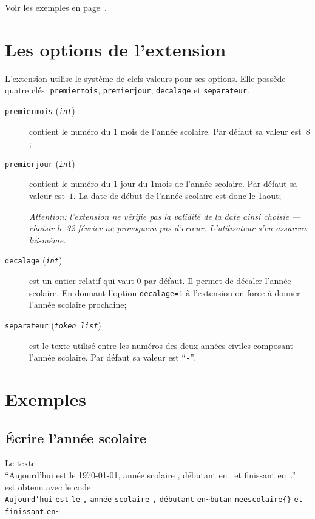 \documentclass[full]{l3doc}
\newcommand\BOP{\discretionary{}{}{}}
\begin{document}
Voir les exemples en page~\pageref{sec:aspect}.


\section{Les options de l'extension}
\label{sec:clefs}

L'extension utilise le système de clefs-valeurs pour ses options. Elle possède
quatre clés: \texttt{premiermois}, \texttt{premierjour}, \texttt{decalage} et
\texttt{separateur}.

\begin{description}
\item[\texttt{premiermois} (\textit{\texttt{int}})] contient le numéro du 1\ier
  mois de l'année scolaire. Par défaut sa valeur est~\(8\);

\item[\texttt{premierjour} (\textit{\texttt{int}})] contient le numéro du 1\ier
  jour du 1\ier mois de l'année scolaire. Par défaut sa valeur est~\(1\). La
  date de début de l'année scolaire est donc le 1\ier aout;

  \emph{Attention: l'extension ne vérifie pas la validité de la date ainsi
    choisie --- choisir le 32 février ne provoquera pas d'erreur. L'utilisateur
    s'en assurera lui-même.}

\item[\texttt{decalage} (\textit{\texttt{int}})] est un entier relatif qui vaut
  \(0\) par défaut. Il permet de décaler l'année scolaire. En donnant l'option
  \verb|decalage=1| à l'extension on force  à donner l'année
  scolaire prochaine;

\item[\texttt{separateur} (\textit{\texttt{token list}})] est le texte utilisé
  entre les numéros des deux années civiles composant l'année scolaire. Par
  défaut sa valeur est \enquote{\texttt{-}}.
\end{description}


\section{Exemples}
\label{sec:exemples}

\subsection{Écrire l'année scolaire}
\label{sec:ecrireannee}

Le texte\\[0.5\baselineskip]
\enquote{Aujourd'hui est le \today, année scolaire \anneescolaire, débutant
  en~\debutanneescolaire{} et finissant en~\finanneescolaire.}\\[0.5\baselineskip]
est obtenu avec le code\\[0.5\baselineskip]
\texttt{Aujourd'hui} \texttt{est} \texttt{le} \texttt{,}
\texttt{année} \texttt{scolaire} \texttt{,} \texttt{débutant}
\texttt{en}\verb|~|\BOP{}\texttt{but}\BOP \texttt{an}\BOP
\texttt{nee}\BOP \texttt{sco}\BOP \texttt{laire}\verb|{}| \texttt{et}
\texttt{finissant} \texttt{en}\verb|~|.
\end{document}
